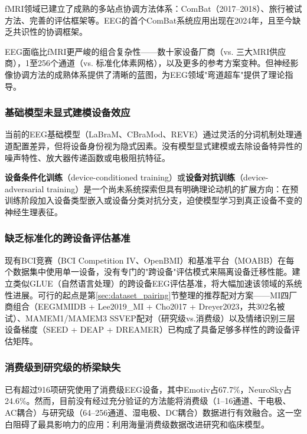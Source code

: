 \documentclass[12pt, a4paper]{article}
\begin{document}
fMRI领域已建立了成熟的多站点协调方法体系：ComBat（2017--2018）\citep{Fortin2017DTI, Fortin2018cortical}、旅行被试方法、完善的评估框架等。EEG的首个ComBat系统应用出现在2024年\citep{Jaramillo2024ComBat}，且至今缺乏共识性的协调框架。

EEG面临比fMRI更严峻的组合复杂性——数十家设备厂商（vs. 三大MRI供应商），1至256个通道（vs. 标准化体素网格），以及更多的参考方案变种。但神经影像协调方法的成熟体系提供了清晰的蓝图，为EEG领域"弯道超车"提供了理论指导。

\subsubsection{基础模型未显式建模设备效应}

当前的EEG基础模型（LaBraM\citep{Jiang2024LaBraM}、CBraMod\citep{Wang2025CBraMod}、REVE\citep{ElOuahidi2025REVE}）通过灵活的分词机制处理通道配置差异，但将设备身份视为隐式因素。没有模型显式建模或去除设备特异性的噪声特性、放大器传递函数或电极阻抗特征。

\textbf{设备条件化训练}（device-conditioned training）或\textbf{设备对抗训练}（device-adversarial training）是一个尚未系统探索但具有明确理论动机的扩展方向：在预训练阶段加入设备类型嵌入或设备分类对抗分支，迫使模型学习到真正设备不变的神经生理表征。

\subsubsection{缺乏标准化的跨设备评估基准}

现有BCI竞赛（BCI Competition IV\citep{Tangermann2012BCIcomp}、OpenBMI\citep{Lee2019OpenBMI}）和基准平台（MOABB\citep{Chevallier2024MOABB}）在每个数据集中使用单一设备，没有专门的"跨设备"评估模式来隔离设备迁移性能。建立类似GLUE（自然语言处理）的跨设备EEG评估基准，将大幅加速该领域的系统性进展。可行的起点是第\ref{sec:dataset_pairing}节整理的推荐配对方案——MI四厂商组合（EEGMMIDB + Lee2019\_MI + Cho2017 + Dreyer2023，共302名被试）、MAMEM1/MAMEM3 SSVEP配对（研究级vs.消费级）以及情绪识别三层设备梯度（SEED + DEAP + DREAMER）已构成了具备足够多样性的跨设备评估矩阵。

\subsubsection{消费级到研究级的桥梁缺失}

已有超过916项研究使用了消费级EEG设备\citep{Sabio2024scoping}，其中Emotiv占67.7\%，NeuroSky占24.6\%。然而，目前没有经过充分验证的方法能将消费级（1--16通道、干电极、AC耦合）与研究级（64--256通道、湿电极、DC耦合）数据进行有效融合。这一空白阻碍了最具影响力的应用：利用海量消费级数据改进研究和临床模型。
\end{document}
